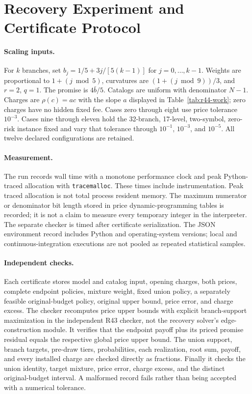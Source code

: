 \section{Recovery Experiment and Certificate Protocol}\label{sec:r44-protocol}
\paragraph{Scaling inputs.}
For $k$ branches, set $b_j=1/5+3j/[5(k-1)]$ for $j=0,\ldots,k-1$. Weights are proportional to $1+(j\bmod5)$, curvatures are $(1+(j\bmod9))/3$, and $r=2$, $q=1$. The promise is $4\bar b/5$. Catalogs are uniform with denominator $N-1$. Charges are $\rho(c)=ac$ with the slope $a$ displayed in Table~\ref{tab:r44-work}; zero charges have no hidden fixed fee. Cases zero through eight use price tolerance $10^{-3}$. Cases nine through eleven hold the 32-branch, 17-level, two-symbol, zero-risk instance fixed and vary that tolerance through $10^{-1}$, $10^{-3}$, and $10^{-5}$. All twelve declared configurations are retained.

\paragraph{Measurement.}
The run records wall time with a monotone performance clock and peak Python-traced allocation with \texttt{tracemalloc}. These times include instrumentation. Peak traced allocation is not total process resident memory. The maximum numerator or denominator bit length stored in price dynamic-programming tables is recorded; it is not a claim to measure every temporary integer in the interpreter. The separate checker is timed after certificate serialization. The JSON environment record includes Python and operating-system versions; local and continuous-integration executions are not pooled as repeated statistical samples.

\paragraph{Independent checks.}
Each certificate stores model and catalog input, opening charges, both prices, complete endpoint policies, mixture weight, fixed union policy, a separately feasible original-budget policy, original upper bound, price error, and charge excess. The checker recomputes price upper bounds with explicit branch-support maximization in the independent R43 checker, not the recovery solver's edge-construction module. It verifies that the endpoint payoff plus its priced promise residual equals the respective global price upper bound. The union support, branch targets, pre-draw tiers, probabilities, each realization, root sum, payoff, and every installed charge are checked directly as fractions. Finally it checks the union identity, target mixture, price error, charge excess, and the distinct original-budget interval. A malformed record fails rather than being accepted with a numerical tolerance.

